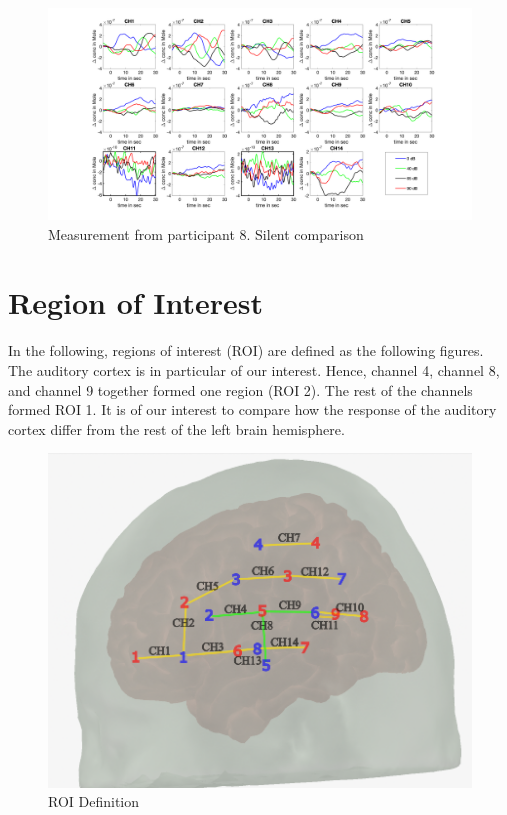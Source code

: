 \begin{figure}[H]
  \centering
    \includegraphics[scale=.4]{bilder/HbR_Mole/sub_luca2_s_HbR.png}
  \caption{Measurement from participant 8. Silent comparison}
\end{figure}



\newpage

\section {Region of Interest}
In the following, regions of interest (ROI) are defined as the following figures. The auditory cortex is in particular of our interest. Hence, channel 4, channel 8, and channel 9 together formed one region (ROI 2). The rest of the channels formed ROI 1. It is of our interest to compare how the response of the auditory cortex differ from the rest of the left brain hemisphere.

\vspace{1cm}
\begin{figure}[H]
  \centering
    \includegraphics[scale=.5]{bilder/optode_roi_ink.png}
  \caption{ROI Definition}
\end{figure}

